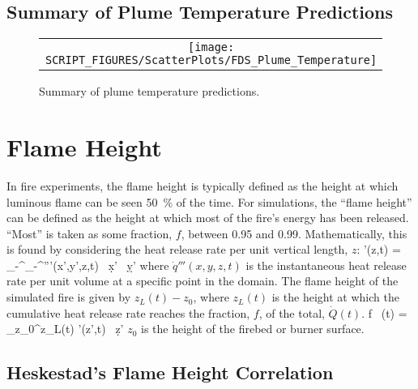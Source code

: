 \clearpage


\subsection{Summary of Plume Temperature Predictions}
\label{Plume Temperature}



\begin{figure}[h!]
\begin{center}
\begin{tabular}{c}
\texttt{[image: SCRIPT\_FIGURES/ScatterPlots/FDS\_Plume\_Temperature]}
\end{tabular}
\end{center}
\caption[Summary of plume temperature predictions]
{Summary of plume temperature predictions.}
\label{Plume_Summary}
\end{figure}

\clearpage


\section{Flame Height}

In fire experiments, the flame height is typically defined as the height at which luminous flame can be seen 50~\% of the time. For simulations, the ``flame height'' can be defined as the height at which most of the fire's energy has been released. ``Most'' is taken as some fraction, $f$, between 0.95 and 0.99. Mathematically, this is found by considering the heat release rate per unit vertical length, $z$:
\be
   '(z,t) = \int_{-\infty}^\infty  \int_{-\infty}^\infty {}'''(x',y',z,t) \, \d x' \, \d y'
\ee
where $\dot{q}'''(x,y,z,t)$ is the instantaneous heat release rate per unit volume at a specific point in the domain. The flame height of the simulated fire is given by $z_L(t)-z_0$, where $z_L(t)$ is the height at which the cumulative heat release rate reaches the fraction, $f$, of the total, $\dot{Q}(t)$.
\be
   f \, (t) = \int_{z_0}^{z_L(t)}  '(z',t) \, \d z'
\ee
$z_0$ is the height of the firebed or burner surface.

\subsection{Heskestad's Flame Height Correlation}

